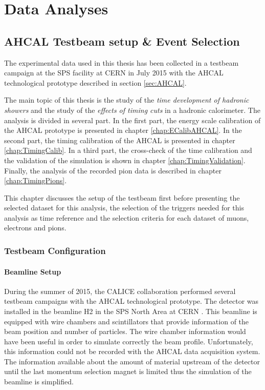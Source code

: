 \part{Data Analyses}
\label{chap:TimingAHCAL}

\chapter{AHCAL Testbeam setup \& Event Selection}
\label{chap:EvtSelection}

The experimental data used in this thesis has been collected in a testbeam campaign at the SPS facility at CERN in July 2015 with the AHCAL technological prototype described in section \ref{sec:AHCAL}.

The main topic of this thesis is the study of the \textit{time development of hadronic showers} and the study of the \textit{effects of timing cuts} in a hadronic calorimeter. The analysis is divided in several part. In the first part, the energy scale calibration of the AHCAL prototype is presented in chapter \ref{chap:ECalibAHCAL}. In the second part, the timing calibration of the AHCAL is presented in chapter \ref{chap:TimingCalib}. In a third part, the cross-check of the time calibration and the validation of the simulation is shown in chapter \ref{chap:TimingValidation}. Finally, the analysis of the recorded pion data is described in chapter \ref{chap:TimingPions}.

This chapter discusses the setup of the testbeam first before presenting the selected dataset for this analysis, the selection of the triggers needed for this analysis as time reference and the selection criteria for each dataset of muons, electrons and pions.

\section{Testbeam Configuration}

\subsection{Beamline Setup}
\label{sec:beamline}

During the summer of 2015, the CALICE collaboration performed several testbeam campaigns with the AHCAL technological prototype. The detector was installed in the beamline H2 in the SPS North Area at CERN \cite{H2Beamline}. This beamline is equipped with wire chambers and scintillators that provide information of the beam position and number of particles. The wire chamber information would have been useful in order to simulate correctly the beam profile. Unfortunately, this information could not be recorded with the AHCAL data acquisition system. The information available about the amount of material upstream of the detector until the last momentum selection magnet is limited thus the simulation of the beamline is simplified.

